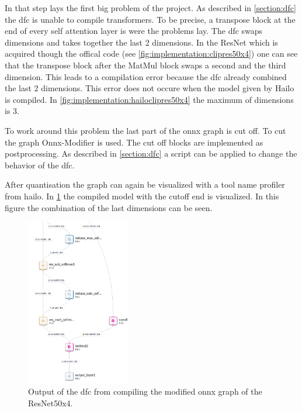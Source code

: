 In that step lays the first big problem of the project.
As described in \cref{section:dfc} the \acrshort{dfc} is unable to compile transformers.
To be precise, a transpose block at the end of every self attention layer is were the problems lay.
The \acrshort{dfc} swaps dimensions and takes together the last 2 dimensions.
In the ResNet which is acquired though the offical code (see \cref{fig:implementation:clipres50x4}) one can see that the transpose block after the MatMul block swaps a second and the third dimension.
This leads to a compilation error because the \acrshort{dfc} already combined the last 2 dimensions.
This error does not occure when the model given by Hailo is compiled.
In \cref{fig:implementation:hailoclipres50x4} the maximum of dimensions is 3.

To work around this problem the last part of the onnx graph is cut off.
To cut the graph Onnx-Modifier \cite{onnxmodifier} is used.
The cut off blocks are implemented as postprocessing.
As described in \cref{section:dfc} a script can be applied to change the behavior of the \acrshort{dfc}.

After quantisation the graph can again be visualized with a tool name profiler from hailo.
In \cref{fig:implementation:compareRN50x4qunathar} the compiled model with the cutoff end is visualized.
In this figure the combination of the last dimensions can be seen.

\begin{figure}
    \centering
    \includegraphics[width=0.4\textwidth]{Images/Implementation/ClipRes50x4_qunat_Har.png}
    \caption{Output of the \acrshort{dfc} from compiling the modified onnx graph of the ResNet50x4.}
    \label{fig:implementation:compareRN50x4qunathar}
\end{figure}

